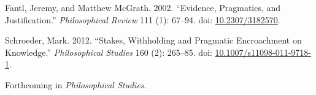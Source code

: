 \documentclass[
  11pt,
  letterpaper,
  DIV=11,
  numbers=noendperiod,
  twoside]{scrartcl}
\newlength{\cslhangindent}
\newenvironment{CSLReferences}[2] %
 {\begin{list}{}{%
  \setlength{\itemindent}{0pt}
  \setlength{\leftmargin}{0pt}
  \setlength{\parsep}{0pt}
  \ifodd #1
   \setlength{\leftmargin}{\cslhangindent}
   \setlength{\itemindent}{-1\cslhangindent}
  \fi
  \setlength{\itemsep}{#2\baselineskip}}}
 {\end{list}}
\begin{document}
\protect{}\label{refs}
\begin{CSLReferences}{1}{0}
Fantl, Jeremy, and Matthew McGrath. 2002. {``Evidence, Pragmatics, and
Justification.''} \emph{Philosophical Review} 111 (1): 67--94. doi:
\href{https://doi.org/10.2307/3182570}{10.2307/3182570}.

Schroeder, Mark. 2012. {``Stakes, Withholding and Pragmatic Encroachment
on Knowledge.''} \emph{Philosophical Studies} 160 (2): 265--85. doi:
\href{https://doi.org/10.1007/s11098-011-9718-1}{10.1007/s11098-011-9718-1}.

\end{CSLReferences}



\noindent Forthcoming in \emph{Philosophical Studies}.
\end{document}
